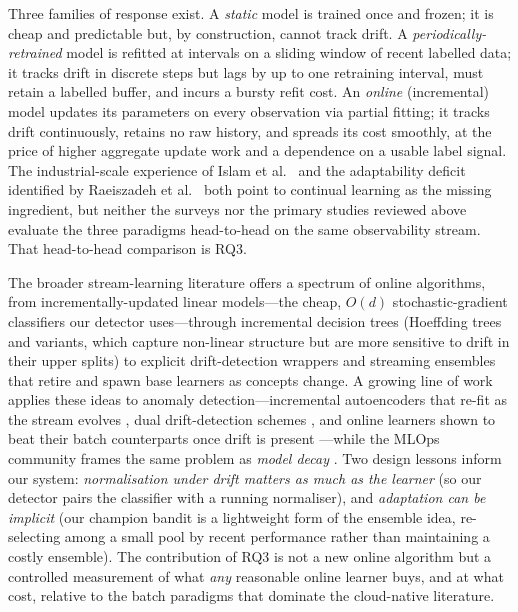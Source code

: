 \documentclass[pdflatex,sn-mathphys-num]{sn-jnl}%
\theoremstyle{thmstyleone}%
\theoremstyle{thmstyletwo}%
\theoremstyle{thmstylethree}%
\begin{document}
Three families of response exist. A \emph{static} model is trained once and frozen; it is cheap and predictable but, by construction, cannot track drift. A \emph{periodically-retrained} model is refitted at intervals on a sliding window of recent labelled data; it tracks drift in discrete steps but lags by up to one retraining interval, must retain a labelled buffer, and incurs a bursty refit cost. An \emph{online} (incremental) model updates its parameters on every observation via partial fitting; it tracks drift continuously, retains no raw history, and spreads its cost smoothly, at the price of higher aggregate update work and a dependence on a usable label signal. The industrial-scale experience of Islam et al.\ \cite{islam2021} and the adaptability deficit identified by Raeiszadeh et al.\ \cite{raeiszadeh2026} both point to continual learning as the missing ingredient, but neither the surveys nor the primary studies reviewed above evaluate the three paradigms head-to-head on the same observability stream. That head-to-head comparison is RQ3.

The broader stream-learning literature offers a spectrum of online algorithms, from incrementally-updated linear models---the cheap, $O(d)$ stochastic-gradient classifiers our detector uses---through incremental decision trees (Hoeffding trees and variants, which capture non-linear structure but are more sensitive to drift in their upper splits) to explicit drift-detection wrappers and streaming ensembles that retire and spawn base learners as concepts change. A growing line of work applies these ideas to anomaly detection---incremental autoencoders that re-fit as the stream evolves \cite{li2023autoencoder}, dual drift-detection schemes \cite{li2024incremental}, and online learners shown to beat their batch counterparts once drift is present \cite{wette2024omlad}---while the MLOps community frames the same problem as \emph{model decay} \cite{leest2025mlmonitoring}. Two design lessons inform our system: \emph{normalisation under drift matters as much as the learner} (so our detector pairs the classifier with a running normaliser), and \emph{adaptation can be implicit} (our champion bandit is a lightweight form of the ensemble idea, re-selecting among a small pool by recent performance rather than maintaining a costly ensemble). The contribution of RQ3 is not a new online algorithm but a controlled measurement of what \emph{any} reasonable online learner buys, and at what cost, relative to the batch paradigms that dominate the cloud-native literature.
\end{document}
